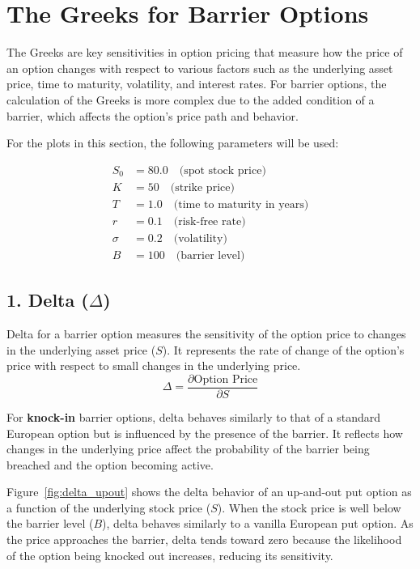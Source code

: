 \chapter{The Greeks for Barrier Options}
\label{sec:greeks}

The Greeks are key sensitivities in option pricing that measure how the price of an option changes with respect to various factors such as the underlying asset price, time to maturity, volatility, and interest rates. For barrier options, the calculation of the Greeks is more complex due to the added condition of a barrier, which affects the option's price path and behavior.

For the plots in this section, the following parameters will be used:

\[
\begin{aligned}
S_0 &= 80.0 \quad \text{(spot stock price)} \\
K &= 50 \quad \text{(strike price)} \\
T &= 1.0 \quad \text{(time to maturity in years)} \\
r &= 0.1 \quad \text{(risk-free rate)} \\
\sigma &= 0.2 \quad \text{(volatility)} \\
B &= 100 \quad \text{(barrier level)}
\end{aligned}
\]




\section*{1. Delta (\(\Delta\))}

Delta for a barrier option measures the sensitivity of the option price to changes in the underlying asset price (\(S\)). It represents the rate of change of the option's price with respect to small changes in the underlying price.
\[
\Delta = \frac{\partial \text{Option Price}}{\partial S}
\]

For \textbf{knock-in} barrier options, delta behaves similarly to that of a standard European option but is influenced by the presence of the barrier. It reflects how changes in the underlying price affect the probability of the barrier being breached and the option becoming active.

Figure~\ref{fig:delta_upout} shows the delta behavior of an up-and-out put option as a function of the underlying stock price (\(S\)). When the stock price is well below the barrier level (\(B\)), delta behaves similarly to a vanilla European put option. As the price approaches the barrier, delta tends toward zero because the likelihood of the option being knocked out increases, reducing its sensitivity.


